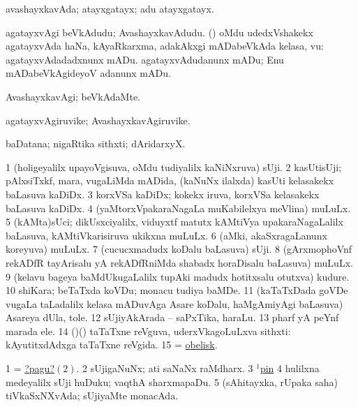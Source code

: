 \bentry
{}
\gl{\gu}
\bmng
avashayxkavAda; atayxgatayx;  adu atayxgatayx. 
\emng

\noindent
\gl{\pagu}
\bmng
{} 
\banum
{} agatayxvAgi beVkAdudu; AvashayxkavAdudu. 
 (\ashi) oMdu udedxVshakekx agatayxvAda haNa, kAyaRkarxma, adakAkxgi mADabeVkAda kelasa, \mo vu:  agatayxvAdadadxnunx mADu.  agatayxvAdudanunx mADu; Enu mADabeVkAgideyoV adanunx mADu. 
\eanum
\emng
\eentry

\bentry
{}
\gl{\kirxvi}
\bmng
AvashayxkavAgi; beVkAdaMte. 
\emng
\eentry

\bentry
{}
\gl{\nA}
\bmng
agatayxvAgiruvike; AvashayxkavAgiruvike. 
\emng
\eentry

\bentry
{}
\gl{\nA}
\bmng
baDatana; nigaRtika sithxti; dAridarxyX. 
\emng
\eentry

\bentry
{}
\gl{\nA}
\bmng
\bnum
\num{1} (holigeyalilx upayoVgisuva, oMdu tudiyalilx kaNiNxruva) sUji. 
\num{2} kasUtisUji; pAlxsiTxkf, mara, \mo vugaLiMda mADida, (kaNuNx ilalxda) kasUti kelasakekx baLasuva kaDiDx. 
\num{3} korxVSa kaDiDx; kokekx iruva, korxVSa kelasakekx baLasuva kaDiDx. 
\num{4} (yaMtorxVpakaraNagaLa muKabilelxya meVlina) muLuLx. 
\num{5} (kAMta)sUci; dikUsxciyalilx, viduyxtf matutx kAMtiVya upakaraNagaLalilx baLasuva, kAMtiVkarisiruva ukikxna muLuLx. 
\num{6} (aMki, akaSxragaLanunx koreyuva) muLuLx. 
\num{7} (cucucxmadudx koDalu baLasuva) sUji. 
\num{8} (gArxmophoVnf rekADfR tayArisalu yA rekADfRniMda shabadx horaDisalu baLasuva) muLuLx. 
\num{9} (kelavu bageya baMdUkugaLalilx tupAki madudx hotitxsalu otutxva) kudure. 
\num{10} shiKara; beTaTxda koVDu; monacu tudiya baMDe. 
\num{11} (kaTaTxDada goVDe \mo vugaLa taLadalilx kelasa mADuvAga Asare koDalu, haMgAmiyAgi baLasuva) Asareya dUla, tole. 
\num{12} sUjiyAkArada -- saPxTika, haraLu. 
\num{13} pharf yA peYnf marada ele. 
\num{14} (\birx)(\ashi) taTaTxne reVguva, uderxVkagoLuLxva sithxti:  kAyutitxdAdxga taTaTxne reVgida. 
\num{15} = \hyperref{kandict_o.pdf}{O}{obelisk}{obelisk}. 
\enum
\emng

\noindent
\gl{\pagu}
\bmng
\bnum
\num{1} = \hyperlink{needle1pagu2}{?pagu?\((2)\)}. 
\hypertarget{needle1pagu2}{} 
\num{2}  sUjigaNuNx; ati saNaNx raMdharx. 
\num{3} \hyperref{kandict_p.pdf}{P}{pin(1) pagu(2)}{$^1$pin} 
\num{4}  hulilxna medeyalilx sUji huDuku; vaqthA sharxmapaDu. 
\num{5}  (sAhitayxka, rUpaka saha) tiVkaSxNXvAda; sUjiyaMte monacAda. 
\enum
\emng
\eentry

